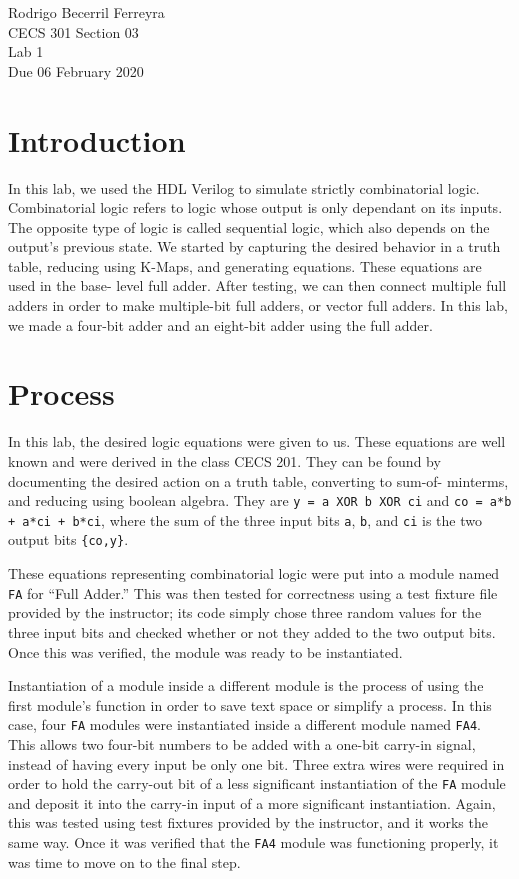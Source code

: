 \documentclass{article}
\renewcommand{\c}[1]{\texttt{#1}}
\begin{document}
\begin{flushright}
    \noindent
    Rodrigo Becerril Ferreyra\\
    CECS 301 Section 03\\
    Lab 1\\
    Due 06 February 2020
\end{flushright}

\section{Introduction} In this lab, we used the HDL Verilog
to simulate strictly combinatorial logic. Combinatorial logic
refers to logic whose output is only dependant on its inputs.
The opposite type of logic is called sequential logic, which
also depends on the output's previous state.
We started by capturing
the desired behavior in a truth table, reducing using K-Maps,
and generating equations. These equations are used in the base-
level full adder. After testing, we can then connect multiple
full adders in order to make multiple-bit full adders, or
vector full adders. In this lab, we made a four-bit adder and an
eight-bit adder using the full adder.

\section{Process} In this lab, the desired logic equations were
given to us. These equations are well known and were derived
in the class CECS 201. They can be found by documenting
the desired action on a truth table, converting to sum-of-
minterms, and reducing using boolean algebra. They are
\c{y = a XOR b XOR ci} and \c{co = a*b + a*ci + b*ci},
where the sum of the three input bits \c{a}, \c{b}, and \c{ci}
is the two output bits \c{\{co,y\}}.

These equations representing combinatorial logic were put into
a module named \c{FA} for ``Full Adder.'' This was then tested
for correctness using a test fixture file provided by the
instructor; its code simply chose three random values for the
three input bits and checked whether or not they added to the
two output bits. Once this was verified, the module was ready
to be instantiated.

Instantiation of a module inside a different module is the
process of using the first module's function in order to save
text space or simplify a process. In this case, four \c{FA}
modules were instantiated inside a different module named \c{FA4}.
This allows two four-bit numbers to be added with a one-bit
carry-in signal, instead of having every input be only one bit.
Three extra wires were required in order to hold the carry-out
bit of a less significant instantiation of the \c{FA} module
and deposit it into the carry-in input of a more significant
instantiation. Again, this was tested using test fixtures
provided by the instructor, and it works the same way.
Once it was verified that the \c{FA4} module was functioning
properly, it was time to move on to the final step.
\end{document}
